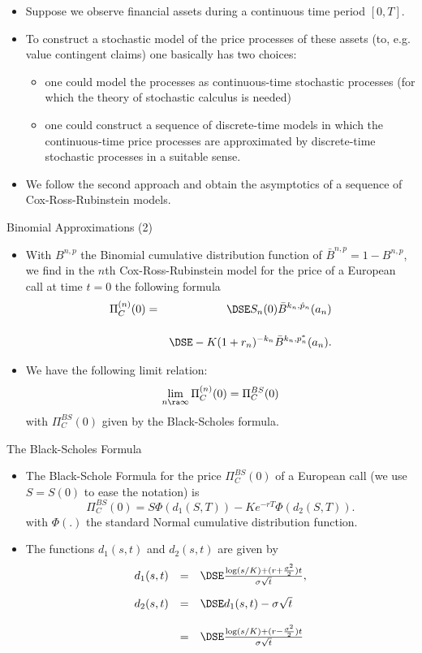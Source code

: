 \begin{itemize}
  \item Suppose we observe financial assets during a continuous time
period $[0,T]$.
\item To construct a stochastic model of the price
processes of these assets (to, e.g. value contingent claims) one
basically has two choices:
\begin{itemize}
  \item one could model the processes as
continuous-time stochastic processes (for which the theory of
stochastic calculus is needed)
\item  one could construct a sequence of discrete-time models in which
the continuous-time price processes are approximated by
discrete-time stochastic processes in a suitable sense.
\end{itemize}
\item  We follow the second approach and obtain the asymptotics
 of a sequence of Cox-Ross-Rubinstein models.
\end{itemize}

{Binomial Approximations (2)}

\begin{itemize}
 \item
 With $B^{n, p}$ the Binomial cumulative distribution function of
 $\bar{B}^{n, p} = 1- B^{n, p}$, we find in the $n$th
Cox-Ross-Rubinstein model for the price of a European call at time
$t=0$ the following formula
\begin{eqnarray}\label{crrpricen}
\Pi_C^{(n)}(0) &=&\DSE S_n(0) \bar{B}^{k_n, \hat{p}_n}(a_n)\\*[12pt]\nonumber
&&\DSE- K
(1+r_n)^{-k_n} \bar{B}^{k_n, p^*_n}(a_n).
\end{eqnarray}
 \item We have the following limit relation:
$$
\lim_{n \ra \infty} \Pi_C^{(n)}(0) = \Pi_C^{BS}(0)
$$
with $\Pi_C^{BS}(0)$ given by the Black-Scholes formula.
\end{itemize}

{The Black-Scholes Formula}

\begin{itemize}
\item The Black-Schole Formula for the price $\Pi_C^{BS}(0)$ of a European call  (we use
$S=S(0)$ to ease the notation) is
\begin{equation}\label{BScallprice4}
\Pi_C^{BS}(0) = S \Phi(d_1(S, T)) - K e^{-rT} \Phi(d_2(S, T)).
\end{equation}
with $\Phi(.)$ the standard Normal cumulative distribution function.
\item The functions $d_1(s,t)$ and $d_2(s,t)$ are given by
$$
\begin{array}{lll}
d_1(s,t) &=&\DSE \frac{\log(s/K) + (r +
\frac{\sigma^2}{2})t}{\sigma \sqrt{t}},\\*[12pt] d_2(s,t) &=&\DSE
d_1(s,t) -\sigma \sqrt{t}\\*[12pt]
&=&\DSE \frac{\log(s/K) + (r -
\frac{\sigma^2}{2})t}{\sigma \sqrt{t}}
\end{array}
$$
\end{itemize}

